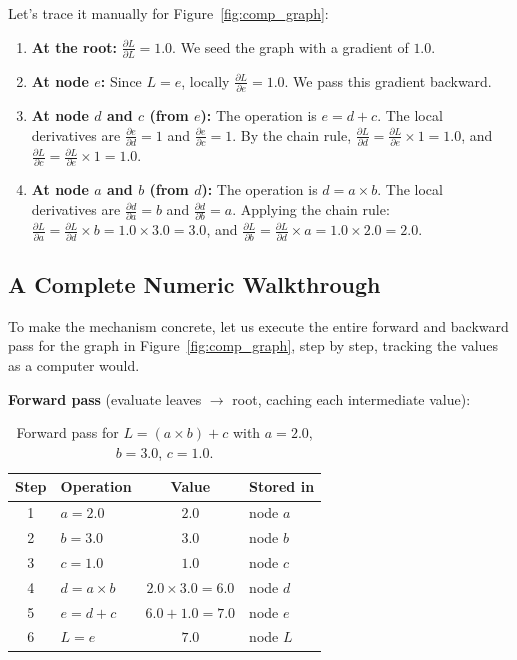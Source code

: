 \documentclass{tufte-handout}
\begin{document}
Let's trace it manually for Figure~\ref{fig:comp_graph}:
\begin{enumerate}[leftmargin=*, itemsep=2pt]
    \item \textbf{At the root:} $\frac{\partial L}{\partial L} = 1.0$. We seed the graph with a gradient of $1.0$.
    \item \textbf{At node $e$:} Since $L = e$, locally $\frac{\partial L}{\partial e} = 1.0$. We pass this gradient backward.
    \item \textbf{At node $d$ and $c$ (from $e$):} The operation is $e = d + c$. The local derivatives are $\frac{\partial e}{\partial d} = 1$ and $\frac{\partial e}{\partial c} = 1$. By the chain rule, $\frac{\partial L}{\partial d} = \frac{\partial L}{\partial e} \times 1 = 1.0$, and $\frac{\partial L}{\partial c} = \frac{\partial L}{\partial e} \times 1 = 1.0$.
    \item \textbf{At node $a$ and $b$ (from $d$):} The operation is $d = a \times b$. The local derivatives are $\frac{\partial d}{\partial a} = b$ and $\frac{\partial d}{\partial b} = a$. Applying the chain rule: $\frac{\partial L}{\partial a} = \frac{\partial L}{\partial d} \times b = 1.0 \times 3.0 = 3.0$, and $\frac{\partial L}{\partial b} = \frac{\partial L}{\partial d} \times a = 1.0 \times 2.0 = 2.0$.
\end{enumerate}

\subsection{A Complete Numeric Walkthrough}

To make the mechanism concrete, let us execute the entire forward and backward pass for the graph in Figure~\ref{fig:comp_graph}, step by step, tracking the values as a computer would.

\textbf{Forward pass} (evaluate leaves $\rightarrow$ root, caching each intermediate value):

\begin{table}[htbp]
\centering
\small
\begin{tabular}{@{}clcl@{}}
\toprule
\textbf{Step} & \textbf{Operation} & \textbf{Value} & \textbf{Stored in} \\
\midrule
1 & $a = 2.0$ & $2.0$ & node $a$ \\
2 & $b = 3.0$ & $3.0$ & node $b$ \\
3 & $c = 1.0$ & $1.0$ & node $c$ \\
4 & $d = a \times b$ & $2.0 \times 3.0 = 6.0$ & node $d$ \\
5 & $e = d + c$ & $6.0 + 1.0 = 7.0$ & node $e$ \\
6 & $L = e$ & $7.0$ & node $L$ \\
\bottomrule
\end{tabular}
\caption{Forward pass for $L = (a \times b) + c$ with $a=2.0$, $b=3.0$, $c=1.0$.}
\label{tab:forward_walk}
\end{table}
\end{document}
